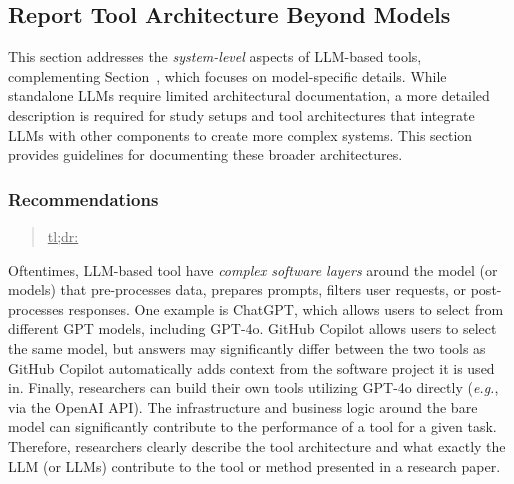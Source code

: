 



\subsection{Report Tool Architecture Beyond Models}

This section addresses the \emph{system-level} aspects of LLM-based tools, complementing Section~\modelversion, which focuses on model-specific details.
While standalone LLMs require limited architectural documentation, a more detailed description is required for study setups and tool architectures that integrate LLMs with other components to create more complex systems.
This section provides guidelines for documenting these broader architectures.

\subsubsection{Recommendations}

\begin{quote}
\underline{tl;dr:} 
\end{quote}

Oftentimes, LLM-based tool have \emph{complex software layers} around the model (or models) that pre-processes data, prepares prompts, filters user requests, or post-processes responses.
One example is ChatGPT, which allows users to select from different GPT models, including GPT-4o.
GitHub Copilot allows users to select the same model, but answers may significantly differ between the two tools as GitHub Copilot automatically adds context from the software project it is used in.
Finally, researchers can build their own tools utilizing GPT-4o directly (\textit{e.g.}, via the OpenAI API).
The infrastructure and business logic around the bare model can significantly contribute to the performance of a tool for a given task.
Therefore, researchers \must clearly describe the tool architecture and what exactly the LLM (or LLMs) contribute to the tool or method presented in a research paper.

